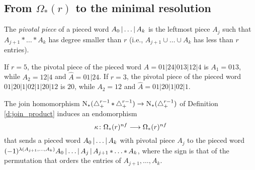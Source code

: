 
\subsection{From \texorpdfstring{$\Omega_*(r)$}{Omega(r)} to the minimal resolution}\label{ss:mapf} The \emph{pivotal piece} of a pieced word $A_0\operatorname{|} \ldots\operatorname{|} A_k$ is the leftmost piece $A_j$ such that $A_{j+1}*\ldots*A_k$ has degree smaller than $r$ (i.e., $A_{j+1}\cup\ldots\cup A_k$ has less than $r$ entries).

\begin{example}
	If $r=5$, the pivotal piece of the pieced word $A=01|24|013|12|4$ is $A_1 = 013$, while $A_2 = 12|4$ and $\hat{A} = 01|24$. If $r=3$, the pivotal piece of the pieced word $01|20|1|02|1|20|12$ is $20$, while $A_2 = 12$ and $\hat{A} = 01|20|1|02|1$.
\end{example}

The join homomorphism $\operatorname{N}_{*}(\triangle_{+}^{r-1}\operatorname{\ast} \triangle_{+}^{r-1})\to \operatorname{N}_{*}(\triangle_{+}^{r-1})$ of Definition \ref{d:join_product} induces an endomorphism
\[
\kappa \colon  \Omega_*(r)^{nf}\longrightarrow \Omega_*(r)^{nf}
\]
that sends a pieced word $A_0\operatorname{|} \ldots\operatorname{|} A_k$ with pivotal piece $A_j$ to the pieced word $(-1)^{\lambda(A_{j+1},\ldots,A_k)}A_0\operatorname{|} \ldots\operatorname{|} A_j\operatorname{|} A_{j+1}\operatorname{\ast}\ldots\operatorname{\ast} A_k$, where the sign is that of the permutation that orders the entries of $A_{j+1},\ldots,A_k$.


